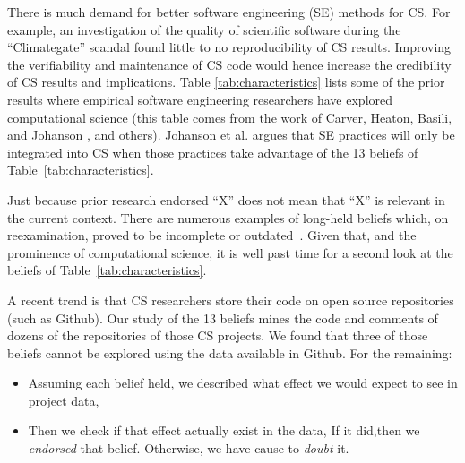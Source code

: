 \documentclass[sigconf,review,anonymous]{acmart}
\newcommand{\bi}{\begin{itemize}}
\newcommand{\ei}{\end{itemize}}
\begin{document}
There is much demand for better software engineering (SE) methods
for CS. For example, an investigation of the 
quality of scientific software during the ``Climategate'' scandal \cite{merali10_error} found little to no reproducibility of CS results. Improving the verifiability and maintenance of CS code would hence increase the credibility of CS results and implications. Table \ref{tab:characteristics}
lists some of the prior results
where empirical software
engineering researchers have explored computational science
(this table comes from the work of
Carver, Heaton, Basili, and Johanson \cite{carver13_perception, carver07_environment, basili08_hpc, heaton15_lit, johan18_secs}, and others).
Johanson et al. \cite{johan18_secs}   argues that SE practices will only be integrated into CS when
those practices take advantage of
the   13 beliefs  of
Table~\ref{tab:characteristics}. 
 



Just  because  prior research endorsed
 ``X'' does not mean that  ``X'' is relevant in the current context. There are numerous examples of long-held beliefs which, on reexamination, proved to be incomplete or outdated~\cite{menzies17,dev16}. 
Given that, and the prominence  of 
computational science, it is 
well past time for a second look at the beliefs of 
Table~\ref{tab:characteristics}. 

A recent trend is that CS researchers store their code on open source repositories (such as Github).
Our study of the 13 beliefs mines the code and comments of dozens of the repositories of  those CS projects.
We found that three of those beliefs cannot be explored using the data available in Github. For the remaining:
\bi
\item Assuming each belief held,
we described what effect   we would expect to see in project data,
\item Then we check if that effect actually exist in the data,
If it did,then  we  {\em endorsed} that belief. Otherwise, we have cause to {\em doubt} it. 
\ei
\end{document}
